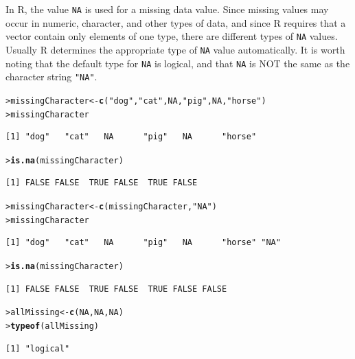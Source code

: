 \documentclass[12pt,oneside]{book}\usepackage[]{graphicx}\usepackage[]{color}
\makeatletter
\newcommand{\hlnum}[1]{\textcolor[rgb]{0.686,0.059,0.569}{#1}}%
\newcommand{\hlstr}[1]{\textcolor[rgb]{0.192,0.494,0.8}{#1}}%
\newcommand{\hlstd}[1]{\textcolor[rgb]{0.345,0.345,0.345}{#1}}%
\newcommand{\hlkwb}[1]{\textcolor[rgb]{0.69,0.353,0.396}{#1}}%
\newcommand{\hlkwd}[1]{\textcolor[rgb]{0.737,0.353,0.396}{\textbf{#1}}}%
\newenvironment{kframe}{%
 \def\at@end@of@kframe{}%
 \ifinner\ifhmode%
  \def\at@end@of@kframe{\end{minipage}}%
  \begin{minipage}{\columnwidth}%
 \fi\fi%
 \def\FrameCommand##1{\hskip\@totalleftmargin \hskip-\fboxsep
 \colorbox{shadecolor}{##1}\hskip-\fboxsep
     \hskip-\linewidth \hskip-\@totalleftmargin \hskip\columnwidth}%
 \MakeFramed {\advance\hsize-\width
   \@totalleftmargin\z@ \linewidth\hsize
   \@setminipage}}%
 {\par\unskip\endMakeFramed%
 \at@end@of@kframe}
\newenvironment{knitrout}{}{} %
\makeatother
\begin{document}
In R, the value \verb+NA+ is used for a missing data value. Since missing values may occur in numeric, character, and other types of data, and since R requires that a vector contain only elements of one type, there are different types of \verb+NA+ values. Usually R determines the appropriate type of \verb+NA+ value automatically. It is worth noting that the default type for \verb+NA+ is logical, and that \verb+NA+ is NOT the same as the character string \verb+"NA"+.
\begin{knitrout}
\color{fgcolor}\begin{kframe}
\begin{alltt}
\hlstd{> }\hlstd{missingCharacter} \hlkwb{<-} \hlkwd{c}\hlstd{(}\hlstr{"dog"}\hlstd{,} \hlstr{"cat"}\hlstd{,} \hlnum{NA}\hlstd{,} \hlstr{"pig"}\hlstd{,} \hlnum{NA}\hlstd{,} \hlstr{"horse"}\hlstd{)}
\hlstd{> }\hlstd{missingCharacter}
\end{alltt}
\begin{verbatim}
[1] "dog"   "cat"   NA      "pig"   NA      "horse"
\end{verbatim}
\begin{alltt}
\hlstd{> }\hlkwd{is.na}\hlstd{(missingCharacter)}
\end{alltt}
\begin{verbatim}
[1] FALSE FALSE  TRUE FALSE  TRUE FALSE
\end{verbatim}
\begin{alltt}
\hlstd{> }\hlstd{missingCharacter} \hlkwb{<-} \hlkwd{c}\hlstd{(missingCharacter,} \hlstr{"NA"}\hlstd{)}
\hlstd{> }\hlstd{missingCharacter}
\end{alltt}
\begin{verbatim}
[1] "dog"   "cat"   NA      "pig"   NA      "horse" "NA"   
\end{verbatim}
\begin{alltt}
\hlstd{> }\hlkwd{is.na}\hlstd{(missingCharacter)}
\end{alltt}
\begin{verbatim}
[1] FALSE FALSE  TRUE FALSE  TRUE FALSE FALSE
\end{verbatim}
\begin{alltt}
\hlstd{> }\hlstd{allMissing} \hlkwb{<-} \hlkwd{c}\hlstd{(}\hlnum{NA}\hlstd{,} \hlnum{NA}\hlstd{,} \hlnum{NA}\hlstd{)}
\hlstd{> }\hlkwd{typeof}\hlstd{(allMissing)}
\end{alltt}
\begin{verbatim}
[1] "logical"
\end{verbatim}
\end{kframe}
\end{knitrout}
\end{document}

